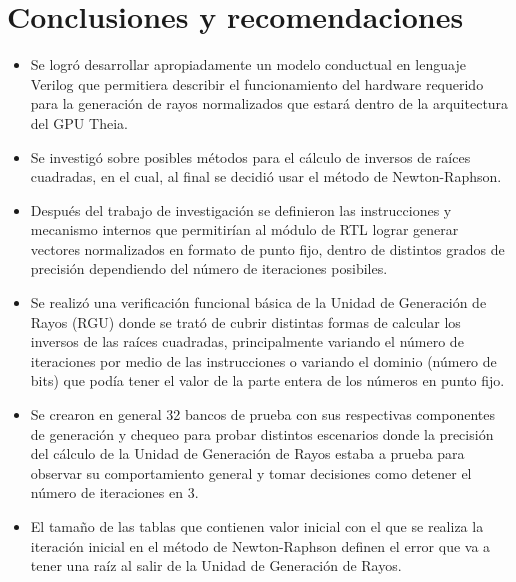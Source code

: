 \chapter{Conclusiones y recomendaciones}

\begin{itemize}

\item Se logró desarrollar apropiadamente un modelo conductual en lenguaje Verilog que permitiera describir el funcionamiento del hardware requerido para la generación de rayos normalizados que estará dentro de la arquitectura del GPU Theia.

\item Se investigó sobre posibles métodos para el cálculo de inversos de raíces cuadradas, en el cual, al final se decidió usar el método de Newton-Raphson.

\item Después del trabajo de investigación se definieron las instrucciones y mecanismo internos que permitirían al módulo de RTL lograr generar vectores normalizados en formato de punto fijo, dentro de distintos grados de precisión dependiendo del número de iteraciones posibiles.

\item Se realizó una verificación funcional básica de la Unidad de Generación de Rayos (RGU) donde se trató de cubrir distintas formas de calcular los inversos de las raíces cuadradas, principalmente variando el número de iteraciones por medio de las instrucciones o variando el dominio (número de bits) que podía tener el valor de la parte entera de los números en punto fijo.

\item Se crearon en general 32 bancos de prueba con sus respectivas componentes de generación y chequeo para probar distintos escenarios donde la precisión del cálculo de la Unidad de Generación de Rayos estaba a prueba para observar su comportamiento general y tomar decisiones como detener el número de iteraciones en 3.  

\item El tamaño de las tablas que contienen valor inicial con el que se realiza la iteración inicial en el método de Newton-Raphson definen el error que va a tener una raíz al salir de la Unidad de Generación de Rayos.  

\end{itemize}

